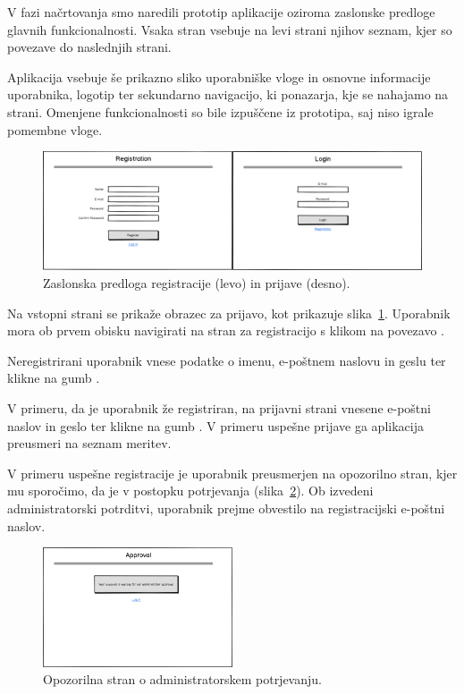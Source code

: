 \documentclass[a4paper, 12pt]{book}
\begin{document}
V fazi načrtovanja smo naredili prototip aplikacije oziroma zaslonske predloge glavnih funkcionalnosti. Vsaka stran vsebuje na levi strani njihov seznam, kjer so povezave do naslednjih strani. 

Aplikacija vsebuje še prikazno sliko uporabniške vloge in osnovne informacije uporabnika, logotip ter sekundarno navigacijo, ki ponazarja, kje se nahajamo na strani. Omenjene funkcionalnosti so bile izpuščene iz prototipa, saj niso igrale pomembne vloge.

\begin{figure}[h]
\begin{center}
\includegraphics[width=\textwidth]{slike/registration_and_Login-wireframe.png}
\end{center}
\caption{Zaslonska predloga registracije (levo) in prijave (desno).}
\label{registration-login-wireframe}
\end{figure}

Na vstopni strani se prikaže obrazec za prijavo, kot prikazuje slika~\ref{registration-login-wireframe}. Uporabnik mora ob prvem obisku navigirati na stran za registracijo s klikom na povezavo .

Neregistrirani uporabnik vnese podatke o imenu, e-poštnem naslovu in geslu ter klikne na gumb .

V primeru, da je uporabnik že registriran, na prijavni strani vnesene e-poštni naslov in geslo ter klikne na gumb . V primeru uspešne prijave ga aplikacija preusmeri na seznam meritev.


V primeru uspešne registracije je uporabnik preusmerjen na opozorilno stran, kjer mu sporočimo, da je v postopku potrjevanja (slika~\ref{approval-wireframe}).
Ob izvedeni administratorski potrditvi, uporabnik prejme obvestilo na registracijski e-poštni naslov.

\begin{figure}[h]
\begin{center}
\includegraphics[width=0.5\textwidth]{slike/NotAlloved.png}
\end{center}
\caption{Opozorilna stran o administratorskem potrjevanju.}
\label{approval-wireframe}
\end{figure}
\end{document}
